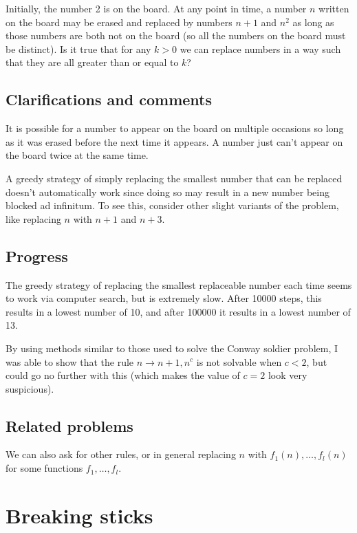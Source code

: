 \documentclass[10pt]{article}
\begin{document}
Initially, the number 2 is on the board. At any point in time, a number $n$ written on the board may be erased and replaced by numbers $n+1$ and $n^2$ as long as those numbers are both not on the board (so all the numbers on the board must be distinct). Is it true that for any $k>0$ we can replace numbers in a way such that they are all greater than or equal to $k$?

\subsection{Clarifications and comments}

It is possible for a number to appear on the board on multiple occasions so long as it was erased before the next time it appears. A number just can't appear on the board twice at the same time.

A greedy strategy of simply replacing the smallest number that can be replaced doesn't automatically work since doing so may result in a new number being blocked ad infinitum. To see this, consider other slight variants of the problem, like replacing $n$ with $n+1$ and $n+3$.

\subsection{Progress}

The greedy strategy of replacing the smallest replaceable number each time seems to work via computer search, but is extremely slow. After 10000 steps, this results in a lowest number of 10, and after 100000 it results in a lowest number of 13.

By using methods similar to those used to solve the Conway soldier problem, I was able to show that the rule $n\to n+1,n^c$ is not solvable when $c<2$, but could go no further with this (which makes the value of $c=2$ look very suspicious).

\subsection{Related problems}

We can also ask for other rules, or in general replacing $n$ with $f_1(n),\ldots,f_l(n)$ for some functions $f_1,\ldots,f_l$.

\pagebreak

\section{Breaking sticks}
\end{document}
